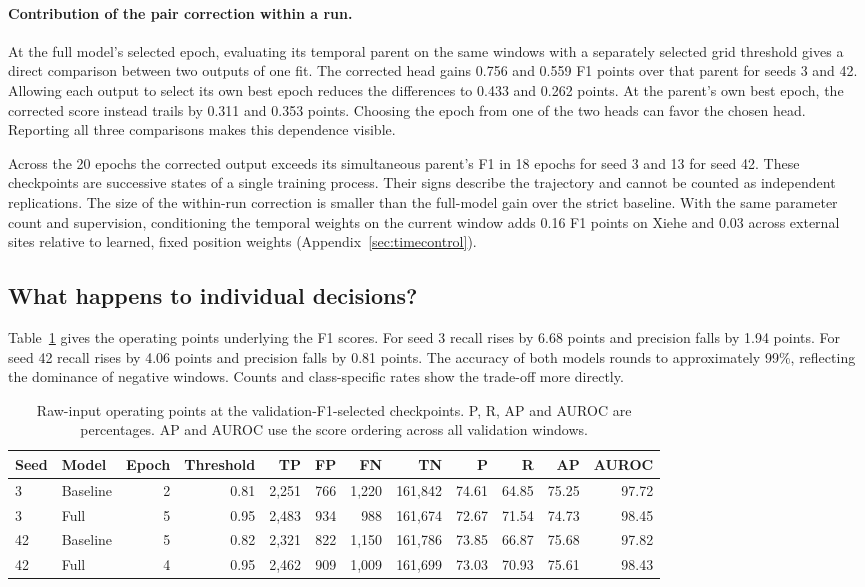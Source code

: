 \documentclass{article}
\begin{document}
\paragraph{Contribution of the pair correction within a run.}
At the full model's selected epoch, evaluating its temporal parent on the same windows with a separately selected grid threshold gives a direct comparison between two outputs of one fit. The corrected head gains 0.756 and 0.559 F1 points over that parent for seeds 3 and 42. Allowing each output to select its own best epoch reduces the differences to 0.433 and 0.262 points. At the parent's own best epoch, the corrected score instead trails by 0.311 and 0.353 points. Choosing the epoch from one of the two heads can favor the chosen head. Reporting all three comparisons makes this dependence visible.

Across the 20 epochs the corrected output exceeds its simultaneous parent's F1 in 18 epochs for seed 3 and 13 for seed 42. These checkpoints are successive states of a single training process. Their signs describe the trajectory and cannot be counted as independent replications. The size of the within-run correction is smaller than the full-model gain over the strict baseline. With the same parameter count and supervision, conditioning the temporal weights on the current window adds 0.16 F1 points on Xiehe and 0.03 across external sites relative to learned, fixed position weights (Appendix~\ref{sec:timecontrol}).

\subsection{What happens to individual decisions?}
Table~\ref{tab:episodes} gives the operating points underlying the F1 scores. For seed 3 recall rises by 6.68 points and precision falls by 1.94 points. For seed 42 recall rises by 4.06 points and precision falls by 0.81 points. The accuracy of both models rounds to approximately 99\%, reflecting the dominance of negative windows. Counts and class-specific rates show the trade-off more directly.

\begin{table}[t]\centering\small
\caption{Raw-input operating points at the validation-F1-selected checkpoints. P, R, AP and AUROC are percentages. AP and AUROC use the score ordering across all validation windows.}\label{tab:episodes}
\begin{tabular}{llrrrrrrrrrr}\toprule
Seed & Model & Epoch & Threshold & TP & FP & FN & TN & P & R & AP & AUROC\\\midrule
3 & Baseline & 2 & 0.81 & 2,251 & 766 & 1,220 & 161,842 & 74.61 & 64.85 & 75.25 & 97.72\\
3 & Full & 5 & 0.95 & 2,483 & 934 & 988 & 161,674 & 72.67 & 71.54 & 74.73 & 98.45\\
42 & Baseline & 5 & 0.82 & 2,321 & 822 & 1,150 & 161,786 & 73.85 & 66.87 & 75.68 & 97.82\\
42 & Full & 4 & 0.95 & 2,462 & 909 & 1,009 & 161,699 & 73.03 & 70.93 & 75.61 & 98.43\\\bottomrule
\end{tabular}
\end{table}
\end{document}

